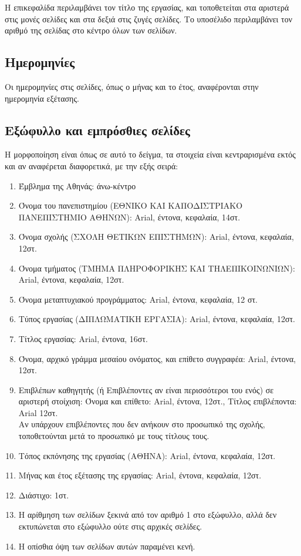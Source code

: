 \documentclass[inscr,ack,preface]{dimscthesis}
\begin{document}
Η επικεφαλίδα περιλαμβάνει τον τίτλο της εργασίας, και τοποθετείται στα αριστερά στις μονές σελίδες και στα δεξιά στις ζυγές σελίδες.
Το υποσέλιδο περιλαμβάνει τον αριθμό της σελίδας στο κέντρο όλων των σελίδων.

\subsection{Ημερομηνίες} \label{dates}

Οι ημερομηνίες στις σελίδες, όπως ο μήνας και το έτος, αναφέρονται στην ημερομηνία εξέτασης.

\subsection{Εξώφυλλο και εμπρόσθιες σελίδες} \label{cover_and_front_matter_pages}

Η μορφοποίηση είναι όπως σε αυτό το δείγμα, τα στοιχεία είναι κεντραρισμένα εκτός και αν αναφέρεται διαφορετικά, με την εξής σειρά:

\begin{enumerate}
    \item Έμβλημα της Αθηνάς: άνω-κέντρο
    \item Όνομα του πανεπιστημίου (ΕΘΝΙΚΟ ΚΑΙ ΚΑΠΟΔΙΣΤΡΙΑΚΟ ΠΑΝΕΠΙΣΤΗΜΙΟ ΑΘΗΝΩΝ): Arial, έντονα, κεφαλαία, 14στ.
    \item Όνομα σχολής (ΣΧΟΛΗ ΘΕΤΙΚΩΝ ΕΠΙΣΤΗΜΩΝ): Arial, έντονα, κεφαλαία, 12στ.
    \item Όνομα τμήματος (ΤΜΗΜΑ ΠΛΗΡΟΦΟΡΙΚΗΣ ΚΑΙ ΤΗΛΕΠΙΚΟΙΝΩΝΙΩΝ): Arial, έντονα, κεφαλαία, 12στ.
    \item Όνομα μεταπτυχιακού προγράμματος: Arial, έντονα, κεφαλαία, 12 στ.
    \item Τύπος εργασίας (ΔΙΠΛΩΜΑΤΙΚΗ ΕΡΓΑΣΙΑ): Arial, έντονα, κεφαλαία, 12στ.
    \item Τίτλος εργασίας: Arial, έντονα, 16στ.
    \item Όνομα, αρχικό γράμμα μεσαίου ονόματος, και επίθετο συγγραφέα: Arial, έντονα, 12στ.
    \item Επιβλέπων καθηγητής (ή Επιβλέποντες αν είναι περισσότεροι του ενός) σε αριστερή στοίχιση: Όνομα και επίθετο: Arial, έντονα, 12στ., Τίτλος επιβλέποντα: Arial 12στ.\\
    Αν υπάρχουν επιβλέποντες που δεν ανήκουν στο προσωπικό της σχολής, τοποθετούνται μετά το προσωπικό με τους τίτλους τους.
    \item Τόπος εκπόνησης της εργασίας (ΑΘΗΝΑ): Arial, έντονα, κεφαλαία, 12στ.
    \item Μήνας και έτος εξέτασης της εργασίας: Arial, έντονα, κεφαλαία, 12στ.
    \item Διάστιχο: 1στ.
    \item Η αρίθμηση των σελίδων ξεκινά από τον αριθμό 1 στο εξώφυλλο, αλλά δεν εκτυπώνεται στο εξώφυλλο ούτε στις αρχικές σελίδες.
    \item Η οπίσθια όψη των σελίδων αυτών παραμένει κενή.
\end{enumerate}
\end{document}
